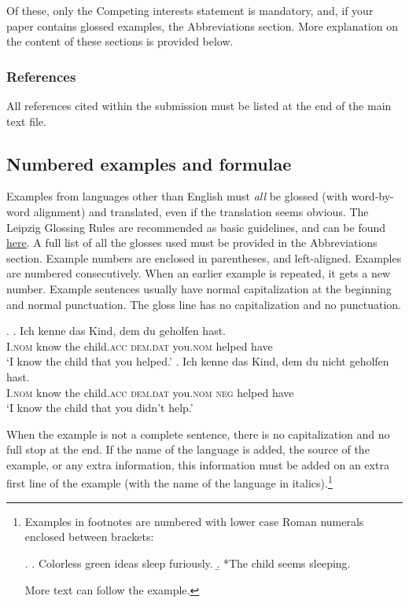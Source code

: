 \documentclass[cm,linguex]{glossa}
\begin{document}
Of these, only the Competing interests statement is mandatory, and, if
your paper contains glossed examples, the Abbreviations section. More
explanation on the content of these sections is provided below.

\hypertarget{references}{%
\subsubsection{References}\label{references}}

All references cited within the submission must be listed at the end of
the main text file.

\hypertarget{numbered-examples-and-formulae}{%
\subsection{Numbered examples and
formulae}\label{numbered-examples-and-formulae}}

Examples from languages other than English must \emph{all} be glossed
(with word-by-word alignment) and translated, even if the translation
seems obvious. The Leipzig Glossing Rules are recommended as basic
guidelines, and can be found
\href{http://www.eva.mpg.de/lingua/resources/glossing-rules.php}{here}.
A full list of all the glosses used must be provided in the
Abbreviations section. Example numbers are enclosed in parentheses, and
left-aligned. Examples are numbered consecutively. When an earlier
example is repeated, it gets a new number. Example sentences usually
have normal capitalization at the beginning and normal punctuation. The
gloss line has no capitalization and no punctuation.

\ex. \ag. Ich   kenne das Kind, dem du geholfen hast.\\
I.\textsc{nom} know the child.\textsc{acc} \textsc{dem.dat} you.\textsc{nom} helped have\\
\glt `I know the child that you helped.'
\bg. Ich kenne das Kind, dem du nicht geholfen hast. \\
I.\textsc{nom} know  the child.\textsc{acc} \textsc{dem.dat} you.\textsc{nom} \textsc{neg} helped   have\\
\glt `I know the child that you didn’t help.’

When the example is not a complete sentence, there is no capitalization
and no full stop at the end. If the name of the language is added, the
source of the example, or any extra information, this information must
be added on an extra first line of the example (with the name of the
language in
italics).\footnote{Examples in footnotes are numbered with lower case Roman numerals enclosed between brackets:

\ex.
\a. Colorless green ideas sleep furiously.
\b. *The child seems sleeping.

More text can follow the example.}
\end{document}
